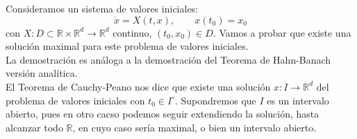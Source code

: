 \begin{ejercicio}
    Consideramos un sistema de valores iniciales:
    \begin{equation*}
        \dot{x} = X(t,x), \qquad x(t_0) = x_0
    \end{equation*}
    con $X:D\subset \mathbb{R}\times\mathbb{R}^d\to \mathbb{R}^d$ continuo, $(t_0,x_0)\in D$. Vamos a probar que existe una solución maximal para este problema de valores iniciales.\\

    \noindent
    La demostración es análoga a la demostración del Teorema de Hahn-Banach versión analítica.\\

    \noindent
    El Teorema de Cauchy-Peano nos dice que existe una solución $x:I\to \mathbb{R}^d$ del problema de valores iniciales con $t_0\in I^\circ$. Supondremos que $I$ es un intervalo abierto, pues en otro cacso podemos seguir extendiendo la solución, hasta alcanzar todo $\mathbb{R}$, en cuyo caso sería maximal, o bien un intervalo abierto.\\


\end{ejercicio}
